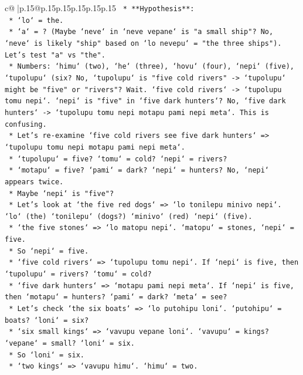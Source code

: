 \documentclass{article}
\begin{document}
{\begin{supertabular}{c@{$\;$}|p{.15\linewidth}@{}p{.15\linewidth}p{.15\linewidth}p{.15\linewidth}p{.15\linewidth}p{.15\linewidth}}
{{{\texttt{    *   **Hypothesis**:} \\
\texttt{        *   `lo` = the.} \\
\texttt{        *   `a` = ? (Maybe `neve` in `neve vepane` is "a small ship"? No, `neve` is likely "ship" based on `lo nevepu` = "the three ships"). Let's test "a" vs "the".} \\
\texttt{        *   Numbers: `himu` (two), `he` (three), `hovu` (four), `nepi` (five), `tupolupu` (six? No, `tupolupu` is "five cold rivers" {-}> `tupolupu` might be "five" or "rivers"? Wait. `five cold rivers` {-}> `tupolupu tomu nepi`. `nepi` is "five" in `five dark hunters`? No, `five dark hunters` {-}> `tupolupu tomu nepi motapu pami nepi meta`. This is confusing.} \\
\texttt{        *   Let's re{-}examine `five cold rivers see five dark hunters` => `tupolupu tomu nepi motapu pami nepi meta`.} \\
\texttt{            *   `tupolupu` = five? `tomu` = cold? `nepi` = rivers?} \\
\texttt{            *   `motapu` = five? `pami` = dark? `nepi` = hunters? No, `nepi` appears twice.} \\
\texttt{            *   Maybe `nepi` is "five"?} \\
\texttt{            *   Let's look at `the five red dogs` => `lo tonilepu minivo nepi`. `lo` (the) `tonilepu` (dogs?) `minivo` (red) `nepi` (five).} \\
\texttt{            *   `the five stones` => `lo matopu nepi`. `matopu` = stones, `nepi` = five.} \\
\texttt{            *   So `nepi` = five.} \\
\texttt{            *   `five cold rivers` => `tupolupu tomu nepi`. If `nepi` is five, then `tupolupu` = rivers? `tomu` = cold?} \\
\texttt{            *   `five dark hunters` => `motapu pami nepi meta`. If `nepi` is five, then `motapu` = hunters? `pami` = dark? `meta` = see?} \\
\texttt{            *   Let's check `the six boats` => `lo putohipu loni`. `putohipu` = boats? `loni` = six?} \\
\texttt{            *   `six small kings` => `vavupu vepane loni`. `vavupu` = kings? `vepane` = small? `loni` = six.} \\
\texttt{            *   So `loni` = six.} \\
\texttt{            *   `two kings` => `vavupu himu`. `himu` = two.} \\
}}}
\end{supertabular}}
\end{document}
